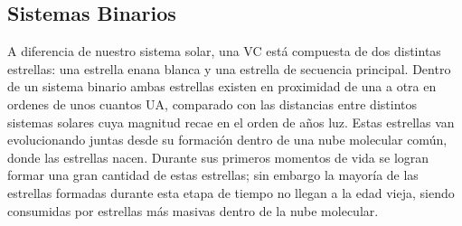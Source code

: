 \subsection{Sistemas Binarios}

A diferencia de nuestro sistema solar, una VC está compuesta de dos distintas
estrellas: una estrella enana blanca y una estrella de secuencia principal.
Dentro de un sistema binario ambas estrellas existen en proximidad de una a otra
en ordenes de unos cuantos UA, comparado con las distancias entre distintos
sistemas solares cuya magnitud recae en el orden de años luz. Estas estrellas
van evolucionando juntas desde su formación dentro de una nube molecular común,
donde las estrellas nacen. Durante sus primeros momentos de vida se logran
formar una gran cantidad de estas estrellas; sin embargo la mayoría de las
estrellas formadas durante esta etapa de tiempo no llegan a la edad vieja,
siendo consumidas por estrellas más masivas dentro de la nube molecular. 